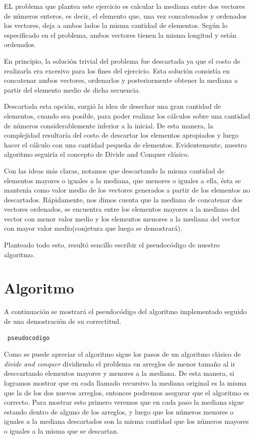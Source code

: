 \documentclass[a4paper,10pt] {article}
\begin{document}
EL problema que plantea este ejercicio es calcular la mediana entre dos vectores de n\'umeros enteros, es decir, el elemento que, una vez concatenados y ordenados los vectores, deja a ambos lados la misma cantidad de elementos. Seg\'un lo especificado en el problema, ambos vectores tienen la misma longitud y est\'an ordenados.

En principio, la soluci\'on trivial del problema fue descartada ya que el costo de realizarla era excesivo para los fines del ejercicio. Esta soluci\'on consist\'ia en concatenar ambos vectores, ordenarlos y posteriormente obtener la mediana a partir del elemento medio de dicha secuencia.

Descartada esta opci\'on, surgi\'o la idea de desechar una gran cantidad de elementos, cuando sea posible, para poder realizar los c\'alculos sobre una cantidad de n\'umeros considerablemente inferior a la inicial. De esta manera, la complejidad resultar\'ia del costo de descartar los elementos apropiados y luego hacer el c\'alculo con una cantidad peque\~{n}a de elementos. Evidentemente, nuestro algoritmo seguir\'ia el concepto de Divide and Conquer cl\'asico.

Con las ideas m\'as claras, notamos que descartando la misma cantidad de elementos mayores o iguales a la mediana, que menores o iguales a ella, \'esta se manten\'ia como valor medio de los vectores generados a partir de los elementos no descartados. R\'apidamente, nos dimos cuenta que la mediana de concatenar dos vectores ordenados, se encuentra entre los elementos mayores a la mediana del vector con menor valor medio y los elementos menores a la mediana del vector con mayor valor medio(conjetura que luego se demostrar\'a).

Planteado todo esto, result\'o sencillo escribir el pseudoc\'odigo de nuestro algoritmo. 

\section*{Algoritmo}

A continuaci\'on se mostrar\'a el pseudoc\'odigo del algoritmo implementado seguido de una demostraci\'on de su correctitud.

\begin{verbatim}
 pseudocodigo
\end{verbatim}

Como se puede apreciar el algoritmo sigue los pasos de un algoritmo cl\'asico de \textit{divide and conquer} dividiendo el problema en arreglos de menor tama\~{n}o al ir desccartando elementos mayores y menores a la mediana. De esta manera, si logramos mostrar que en cada llamado recursivo la mediana original es la misma que la de los dos nuevos arreglos, entonces podremos asegurar que el algoritmo es correcto. Para mostrar esto primero veremos que en cada paso la mediana sigue estando dentro de alguno de los arreglos, y luego que los n\'umeros menores o iguales a la mediana descartados son la misma cantidad que los n\'umeros mayores o iguales a la misma que se descartan.
\end{document}
